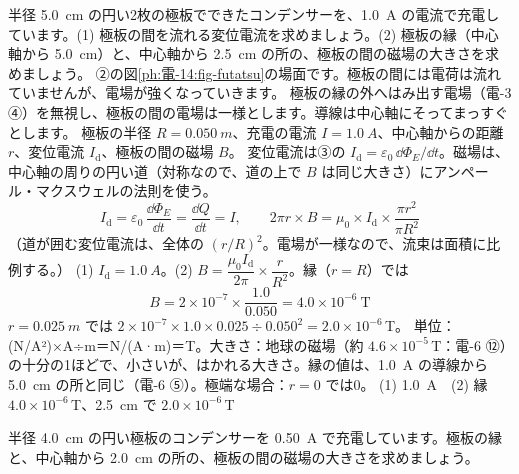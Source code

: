 \begin{phreidai}
\label{ph:電-14:ex1}半径 \qty{5.0}{cm} の円い2枚の極板でできたコンデンサーを、\qty{1.0}{A} の電流で充電しています。(1) 極板の間を流れる変位電流を求めましょう。(2) 極板の縁（中心軸から \qty{5.0}{cm}）と、中心軸から \qty{2.5}{cm} の所の、極板の間の磁場の大きさを求めましょう。
\phbamen
②の図\ref{ph:電-14:fig-futatsu}の場面です。極板の間には電荷は流れていませんが、電場が強くなっていきます。
\phmushi
極板の縁の外へはみ出す電場（電-3 ④）を無視し、極板の間の電場は一様とします。導線は中心軸にそってまっすぐとします。
\phzu
極板の半径 $R=\qty{0.050}{m}$、充電の電流 $I=\qty{1.0}{A}$、中心軸からの距離 $r$、変位電流 $I_{\mathrm d}$、極板の間の磁場 $B$。
\phriyu
変位電流は③の $I_{\mathrm d}=\varepsilon_0\,\dd\Phi_E/\dd t$。磁場は、中心軸の周りの円い道（対称なので、道の上で $B$ は同じ大きさ）にアンペール・マクスウェルの法則を使う。
\phtateru
\[ I_{\mathrm d}=\varepsilon_0\,\frac{\dd\Phi_E}{\dd t}=\frac{\dd Q}{\dd t}=I,\qquad 2\pi r\times B=\mu_0\times I_{\mathrm d}\times\frac{\pi r^2}{\pi R^2} \]
（道が囲む変位電流は、全体の $(r/R)^2$。電場が一様なので、流束は面積に比例する。）
\phtoku
(1) $I_{\mathrm d}=\qty{1.0}{A}$。(2) $B=\dfrac{\mu_0I_{\mathrm d}}{2\pi}\times\dfrac{r}{R^2}$。縁（$r=R$）では
\[ B=2\times10^{-7}\times\frac{1.0}{0.050}=4.0\times10^{-6}\ \mathrm{T} \]
$r=\qty{0.025}{m}$ では $2\times10^{-7}\times1.0\times0.025\div0.050^2=2.0\times10^{-6}$\,T。
\phtashikame
単位：(N/A²)×A÷m＝N/(A·m)＝T。大きさ：地球の磁場（約 $4.6\times10^{-5}$\,T：電-6 ⑫）の十分の1ほどで、小さいが、はかれる大きさ。縁の値は、\qty{1.0}{A} の導線から \qty{5.0}{cm} の所と同じ（電-6 ⑤）。極端な場合：$r=0$ では0。
\kotae (1) \qty{1.0}{A}　(2) 縁 $4.0\times10^{-6}$\,T、\qty{2.5}{cm} で $2.0\times10^{-6}$\,T
\end{phreidai}
\begin{jibun}
半径 \qty{4.0}{cm} の円い極板のコンデンサーを \qty{0.50}{A} で充電しています。極板の縁と、中心軸から \qty{2.0}{cm} の所の、極板の間の磁場の大きさを求めましょう。
\end{jibun}

